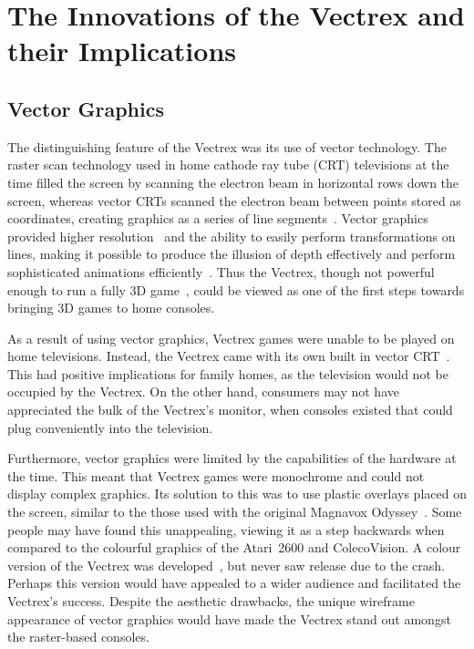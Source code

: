 \documentclass{scrartcl}
\begin{document}
\section*{The Innovations of the Vectrex and their Implications}


\subsection*{Vector Graphics}
The distinguishing feature of the Vectrex was its use of vector technology. The raster scan technology used in home cathode ray tube (CRT) televisions at the time filled the screen by scanning the electron beam in horizontal rows down the screen, whereas vector CRTs scanned the electron beam between points stored as coordinates, creating graphics as a series of line segments~\cite[pp. 20--21]{wolf:medium}. Vector graphics provided higher resolution~\cite[pp. 155--156]{perron:theory} and the ability to easily perform transformations on lines, making it possible to produce the illusion of depth effectively and perform sophisticated animations efficiently~\cite{defanti:impact}. Thus the Vectrex, though not powerful enough to run a fully 3D game~\cite[pp. 155--156]{perron:theory}, could be viewed as one of the first steps towards bringing 3D games to home consoles.

As a result of using vector graphics, Vectrex games were unable to be played on home televisions. Instead, the Vectrex came with its own built in vector CRT~\cite{vectrex:manual}. This had positive implications for family homes, as the television would not be occupied by the Vectrex. On the other hand, consumers may not have appreciated the bulk of the Vectrex's monitor, when consoles existed that could plug conveniently into the television.

Furthermore, vector graphics were limited by the capabilities of the hardware at the time. This meant that Vectrex games were monochrome and could not display complex graphics. Its solution to this was to use plastic overlays placed on the screen, similar to the those used with the original Magnavox Odyssey~\cite[p. 70]{wolf:pong}. Some people may have found this unappealing, viewing it as a step backwards when compared to the colourful graphics of the Atari~2600 and ColecoVision. A colour version of the Vectrex was developed~\cite{defanti:impact}, but never saw release due to the crash. Perhaps this version would have appealed to a wider audience and facilitated the Vectrex's success. Despite the aesthetic drawbacks, the unique wireframe appearance of vector graphics would have made the Vectrex stand out amongst the raster-based consoles. 
\end{document}
